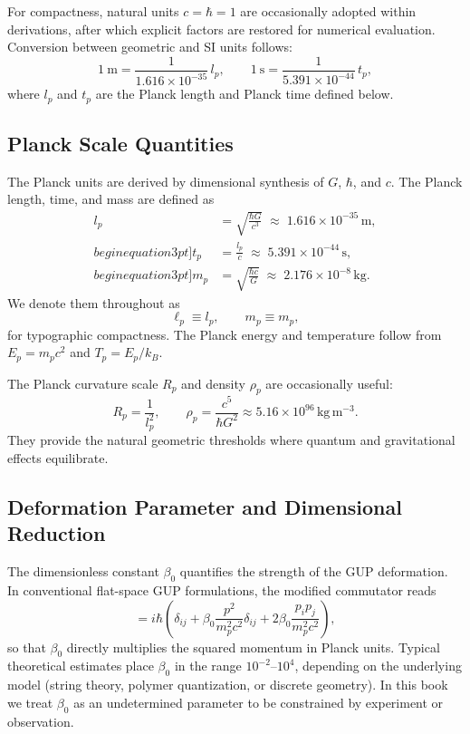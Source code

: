 \documentclass[11pt,oneside]{book}
\numberwithin{equation}{chapter}
\newcommand{\lp}{\ell_p}             %
\newcommand{\mpx}{m_p}               %
\begin{document}
For compactness, natural units $c = \hbar = 1$ are occasionally adopted within derivations, after which explicit factors are restored for numerical evaluation.  
Conversion between geometric and SI units follows:
\begin{equation}
1~\mathrm{m} = \frac{1}{1.616\times10^{-35}}\,l_p,
\qquad
1~\mathrm{s} = \frac{1}{5.391\times10^{-44}}\,t_p,
\end{equation}
where $l_p$ and $t_p$ are the Planck length and Planck time defined below.

\subsection*{Planck Scale Quantities}

The Planck units are derived by dimensional synthesis of $G$, $\hbar$, and $c$.  
The Planck length, time, and mass are defined as
\begin{align*}
l_p &= \sqrt{\frac{\hbar G}{c^3}}
      \;\approx\; 1.616\times10^{-35}\,\mathrm{m}, \\begin{equation}3pt]
t_p &= \frac{l_p}{c}
      \;\approx\; 5.391\times10^{-44}\,\mathrm{s}, \\begin{equation}3pt]
m_p &= \sqrt{\frac{\hbar c}{G}}
      \;\approx\; 2.176\times10^{-8}\,\mathrm{kg}.
\end{align*}
We denote them throughout as
\begin{equation}
\lp \equiv l_p, 
\qquad
\mpx \equiv m_p,
\end{equation}
for typographic compactness.  
The Planck energy and temperature follow from $E_p = m_p c^2$ and $T_p = E_p / k_B$.  

The Planck curvature scale $R_p$ and density $\rho_p$ are occasionally useful:
\begin{equation}
R_p = \frac{1}{l_p^2}, \qquad
\rho_p = \frac{c^5}{\hbar G^2} \approx 5.16\times10^{96}\,\mathrm{kg\,m^{-3}}.
\end{equation}
They provide the natural geometric thresholds where quantum and gravitational effects equilibrate.

\subsection*{Deformation Parameter and Dimensional Reduction}

The dimensionless constant $\beta_0$ quantifies the strength of the GUP deformation.  
In conventional flat-space GUP formulations, the modified commutator reads
\begin{equation}
[x_i,p_j] = i\hbar\left(\delta_{ij} + \beta_0 \frac{p^2}{m_p^2 c^2}\delta_{ij} + 2\beta_0 \frac{p_i p_j}{m_p^2 c^2}\right),
\end{equation}
so that $\beta_0$ directly multiplies the squared momentum in Planck units.  
Typical theoretical estimates place $\beta_0$ in the range $10^{-2}$–$10^4$, depending on the underlying model (string theory, polymer quantization, or discrete geometry).  
In this book we treat $\beta_0$ as an undetermined parameter to be constrained by experiment or observation.
\end{document}
